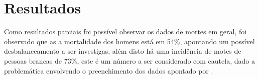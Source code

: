 \chapter{Resultados}

Como resultados parciais foi possível observar os dados de mortes em geral, foi observado que as a mortalidade dos homens está em 54\%, apontando um possível desbalanceamento a ser investigas, além disto há uma incidência de motes de pessoas brancas de 73\%, este é um número a ser considerado com cautela, dado a problemática envolvendo o preenchimento dos dados apontado por .


